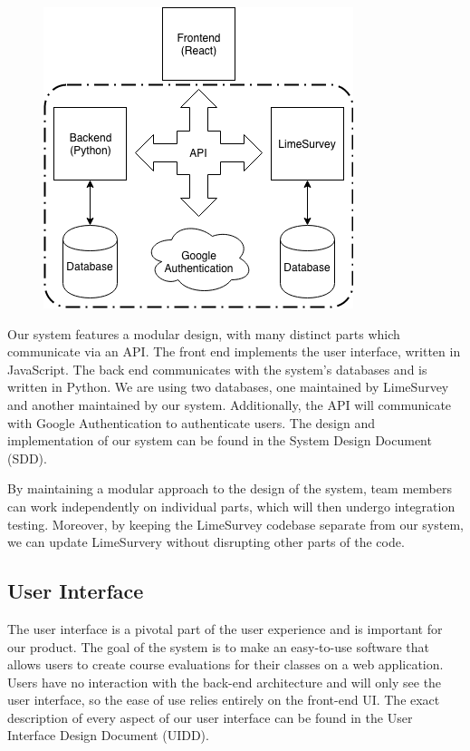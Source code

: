 \documentclass{article}
\begin{document}
\begin{center}
\begin{figure}[H]
\centering
{}
\vspace{2mm}
\label{fig:componentdiagram}
{\includegraphics[scale=.75]{images/component_diagram.png}}
\end{figure}
\end{center}

Our system features a modular design, with many distinct parts which communicate via an API. The front end implements the user interface, written in JavaScript. The back end communicates with the system's databases and is written in Python. We are using two databases, one maintained by LimeSurvey and another maintained by our system. Additionally, the API will communicate with Google Authentication to authenticate users. The design and implementation of our system can be found in the System Design Document (SDD).

By maintaining a modular approach to the design of the system, team members can work independently on individual parts, which will then undergo integration testing. Moreover, by keeping the LimeSurvey codebase separate from our system, we can update LimeSurvery without disrupting other parts of the code. 

\subsection{User Interface}

The user interface is a pivotal part of the user experience and is important for our product. The goal of the system is to make an easy-to-use software that allows users to create course evaluations for their classes on a web application.  Users have no interaction with the back-end architecture and will only see the user interface, so the ease of use relies entirely on the front-end UI.  The exact description of every aspect of our user interface can be found in the User Interface Design Document (UIDD). 
\end{document}
